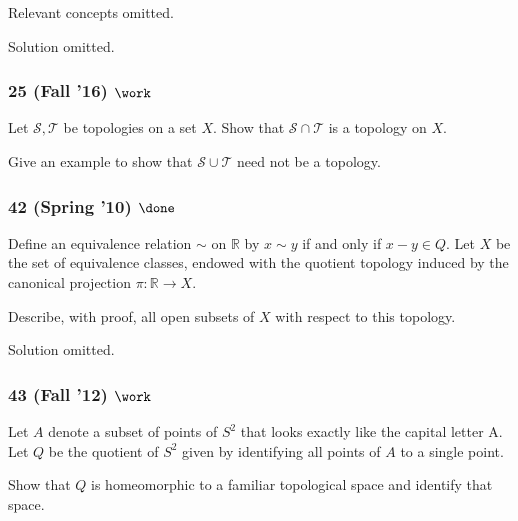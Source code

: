 Relevant concepts omitted.

Solution omitted.

\hypertarget{fall-16-work}{%
\subsubsection{\texorpdfstring{25 (Fall '16)
\(\work\)}{25 (Fall '16) \textbackslash work}}\label{fall-16-work}}

\begin{problem}[?]

Let \({\mathcal{S}}, {\mathcal{T}}\) be topologies on a set \(X\). Show
that \({\mathcal{S}}\cap {\mathcal{T}}\) is a topology on \(X\).

Give an example to show that \({\mathcal{S}}\cup {\mathcal{T}}\) need
not be a topology.

\end{problem}

\hypertarget{spring-10-done-1}{%
\subsubsection{\texorpdfstring{42 (Spring '10)
\(\done\)}{42 (Spring '10) \textbackslash done}}\label{spring-10-done-1}}

\begin{problem}[?]

Define an equivalence relation \(\sim\) on \({\mathbb{R}}\) by
\(x \sim y\) if and only if \(x - y \in Q\). Let \(X\) be the set of
equivalence classes, endowed with the quotient topology induced by the
canonical projection \(\pi : {\mathbb{R}}\to X\).

Describe, with proof, all open subsets of \(X\) with respect to this
topology.

\end{problem}

Solution omitted.

\hypertarget{fall-12-work}{%
\subsubsection{\texorpdfstring{43 (Fall '12)
\(\work\)}{43 (Fall '12) \textbackslash work}}\label{fall-12-work}}

\begin{problem}[?]

Let \(A\) denote a subset of points of \(S^2\) that looks exactly like
the capital letter A. Let \(Q\) be the quotient of \(S^2\) given by
identifying all points of \(A\) to a single point.

Show that \(Q\) is homeomorphic to a familiar topological space and
identify that space.

\end{problem}

